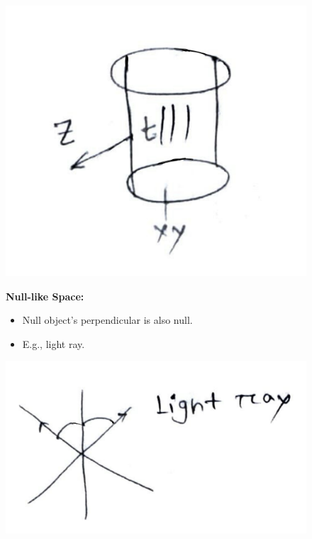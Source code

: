 \documentclass[14pt]{article} %
\begin{document}
\begin{tcolorbox}[ title=Post-class discussions]
\begin{figure}[H]
\begin{minipage}[t]{0.35\textwidth}
        \includegraphics[width=\linewidth]{figures/L5_4.jpeg}
    \end{minipage}
    \begin{minipage}[t]{0.6\textwidth}
    \vspace{-3cm}
        \textbf{Null-like Space:}
        \begin{itemize}
            \item Null object's perpendicular is also null.
            \item E.g., light ray.
        \end{itemize}
    \end{minipage}%
    \hfill
    \begin{minipage}[t]{0.35\textwidth}
        \includegraphics[width=\linewidth]{figures/L5_6.jpeg}
    \end{minipage}

\end{figure}
\end{tcolorbox}
\newpage
\end{document}
